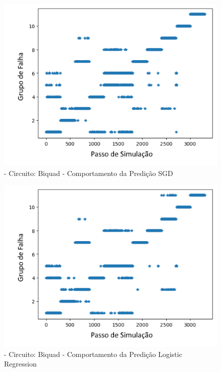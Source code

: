         
        \begin{figure}[H]
        \begin{center}
        \includegraphics[width=13cm]{./01_Pre_textuais/biquad_figs/SGDClassifier_Biquad_Highpass_Filter_mc_+_4bitPRBS_[FALHA]raw.png}
        \caption{\label{fig:DecisionTreeClassifieSalenkey}- Circuito: Biquad - Comportamento da Predição SGD}
        \end{center}
        \end{figure}
        
        
        \begin{figure}[H]
        \begin{center}
        \includegraphics[width=13cm]{./01_Pre_textuais/biquad_figs/LogisticRegression_Biquad_Highpass_Filter_mc_+_4bitPRBS_[FALHA]raw.png}
        \caption{\label{fig:DecisionTreeClassifieSalenkey}- Circuito: Biquad - Comportamento da Predição Logistic Regression }
        \end{center}
        \end{figure}
        
